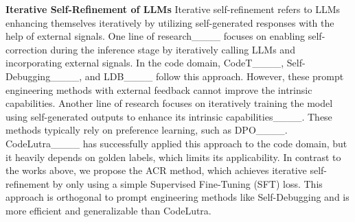 \textbf{Iterative Self-Refinement of LLMs} 
Iterative self-refinement refers to LLMs enhancing themselves iteratively by utilizing self-generated responses with the help of external signals. 
One line of research____ focuses on enabling self-correction during the inference stage by iteratively calling LLMs and incorporating external signals. In the code domain, CodeT____, Self-Debugging____, and LDB____ follow this approach. However, these prompt engineering methods with external feedback cannot improve the intrinsic capabilities. Another line of research focuses on iteratively training the model using self-generated outputs to enhance its intrinsic capabilities____. These methods typically rely on preference learning, such as DPO____. CodeLutra____ has successfully applied this approach to the code domain, but it heavily depends on golden labels, which limits its applicability. In contrast to the works above, we propose the ACR method, which achieves iterative self-refinement by only using a simple Supervised Fine-Tuning (SFT) loss. This approach is orthogonal to prompt engineering methods like Self-Debugging and is more efficient and generalizable than CodeLutra.